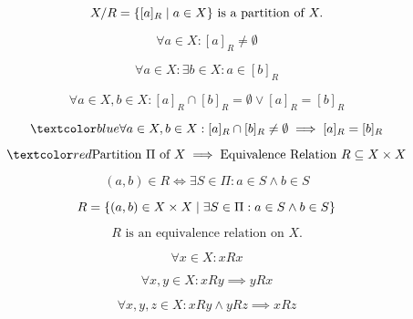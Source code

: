 \begin{frame}{}
  \begin{theorem}
    \[
      X/R = \{[a]_{R} \mid a \in X\} \text{ is a partition of } X.
    \]
  \end{theorem}

  \pause
  \[
    \forall a \in X: [a]_{R} \neq \emptyset
  \]

  \pause
  \[
    \forall a \in X: \exists b \in X: a \in [b]_{R}
  \]

  \pause
  \begin{theorem}
    \[
      \forall a \in X, b \in X: [a]_{R} \cap [b]_{R} = \emptyset \lor [a]_{R} = [b]_{R}
    \]
  \end{theorem}

  \pause
  \[
    \blue{\forall a \in X, b \in X: [a]_{R} \cap [b]_{R} \neq \emptyset \implies [a]_{R} = [b]_{R}}
  \]
\end{frame}


\begin{frame}{}
  \[
    \red{\text{Partition } \Pi \text{ of } X \implies \text{Equivalence Relation } R \subseteq X \times X}
  \]

  \pause
  \begin{definition}
    \[
      (a, b) \in R \iff \exists S \in \Pi: a \in S \land b \in S
    \]

    \pause
    \vspace{-0.20cm}
    \[
      R = \{(a, b) \in X \times X \mid \exists S \in \Pi: a \in S \land b \in S\}
    \]
  \end{definition}

  \pause
  \begin{theorem}
    \[
      R \text{ is an equivalence relation on } X.
    \]
  \end{theorem}

  \pause
  \[
    \forall x \in X: xRx
  \]

  \pause
  \[
    \forall x, y \in X: xRy \implies yRx
  \]

  \pause
  \[
    \forall x, y, z \in X: xRy \land yRz \implies xRz
  \]
\end{frame}

